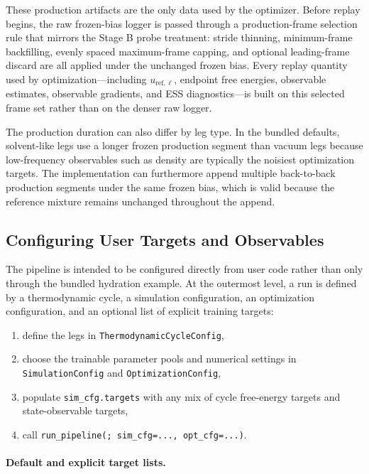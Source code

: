 These production artifacts are the only data used by the optimizer. Before replay begins, the raw frozen-bias logger is passed through a production-frame selection rule that mirrors the Stage B probe treatment: stride thinning, minimum-frame backfilling, evenly spaced maximum-frame capping, and optional leading-frame discard are all applied under the unchanged frozen bias. Every replay quantity used by optimization---including $u_{\mathrm{ref},\ell}$, endpoint free energies, observable estimates, observable gradients, and ESS diagnostics---is built on this selected frame set rather than on the denser raw logger.

The production duration can also differ by leg type. In the bundled defaults, solvent-like legs use a longer frozen production segment than vacuum legs because low-frequency observables such as density are typically the noisiest optimization targets. The implementation can furthermore append multiple back-to-back production segments under the same frozen bias, which is valid because the reference mixture remains unchanged throughout the append.

\subsection{Configuring User Targets and Observables}

The pipeline is intended to be configured directly from user code rather than
only through the bundled hydration example. At the outermost level, a run is
defined by a thermodynamic cycle, a simulation configuration, an optimization
configuration, and an optional list of explicit training targets:

\begin{enumerate}
    \item define the legs in \texttt{ThermodynamicCycleConfig},
    \item choose the trainable parameter pools and numerical settings in \texttt{SimulationConfig} and \texttt{OptimizationConfig},
    \item populate \texttt{sim\_cfg.targets} with any mix of cycle free-energy targets and state-observable targets,
    \item call \texttt{run\_pipeline(; sim\_cfg=..., opt\_cfg=...)}.
\end{enumerate}

\paragraph{Default and explicit target lists.}

